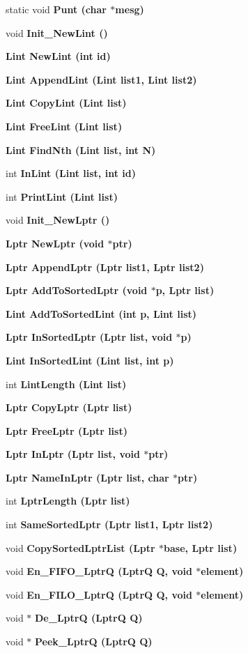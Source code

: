 \begin{CompactItemize}
\item 
static void \bf{Punt} (char $\ast$mesg)
\item 
void \bf{Init\_\-New\-Lint} ()
\item 
\bf{Lint} \bf{New\-Lint} (int id)
\item 
\bf{Lint} \bf{Append\-Lint} (\bf{Lint} list1, \bf{Lint} list2)
\item 
\bf{Lint} \bf{Copy\-Lint} (\bf{Lint} \bf{list})
\item 
\bf{Lint} \bf{Free\-Lint} (\bf{Lint} \bf{list})
\item 
\bf{Lint} \bf{Find\-Nth} (\bf{Lint} \bf{list}, int N)
\item 
int \bf{In\-Lint} (\bf{Lint} \bf{list}, int id)
\item 
int \bf{Print\-Lint} (\bf{Lint} \bf{list})
\item 
void \bf{Init\_\-New\-Lptr} ()
\item 
\bf{Lptr} \bf{New\-Lptr} (void $\ast$ptr)
\item 
\bf{Lptr} \bf{Append\-Lptr} (\bf{Lptr} list1, \bf{Lptr} list2)
\item 
\bf{Lptr} \bf{Add\-To\-Sorted\-Lptr} (void $\ast$p, \bf{Lptr} \bf{list})
\item 
\bf{Lint} \bf{Add\-To\-Sorted\-Lint} (int p, \bf{Lint} \bf{list})
\item 
\bf{Lptr} \bf{In\-Sorted\-Lptr} (\bf{Lptr} \bf{list}, void $\ast$p)
\item 
\bf{Lint} \bf{In\-Sorted\-Lint} (\bf{Lint} \bf{list}, int p)
\item 
int \bf{Lint\-Length} (\bf{Lint} \bf{list})
\item 
\bf{Lptr} \bf{Copy\-Lptr} (\bf{Lptr} \bf{list})
\item 
\bf{Lptr} \bf{Free\-Lptr} (\bf{Lptr} \bf{list})
\item 
\bf{Lptr} \bf{In\-Lptr} (\bf{Lptr} \bf{list}, void $\ast$ptr)
\item 
\bf{Lptr} \bf{Name\-In\-Lptr} (\bf{Lptr} \bf{list}, char $\ast$ptr)
\item 
int \bf{Lptr\-Length} (\bf{Lptr} \bf{list})
\item 
int \bf{Same\-Sorted\-Lptr} (\bf{Lptr} list1, \bf{Lptr} list2)
\item 
void \bf{Copy\-Sorted\-Lptr\-List} (\bf{Lptr} $\ast$base, \bf{Lptr} \bf{list})
\item 
void \bf{En\_\-FIFO\_\-Lptr\-Q} (\bf{Lptr\-Q} Q, void $\ast$element)
\item 
void \bf{En\_\-FILO\_\-Lptr\-Q} (\bf{Lptr\-Q} Q, void $\ast$element)
\item 
void $\ast$ \bf{De\_\-Lptr\-Q} (\bf{Lptr\-Q} Q)
\item 
void $\ast$ \bf{Peek\_\-Lptr\-Q} (\bf{Lptr\-Q} Q)
\end{CompactItemize}
